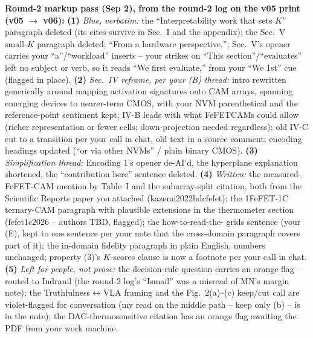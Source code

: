 \documentclass[conference]{IEEEtran}
\newcommand{\cam}{{CAM}\xspace}
\newcommand{\fefet}{{FeFET}\xspace}
\begin{document}
{\begin{pnote}[aiviolet]
\textbf{Round-2 markup pass (Sep 2), from the round-2 log on the v05
print (v05 $\to$ v06):}
{\bf (1)} \emph{Blue, verbatim:} the ``Interpretability work that
sets $K$'' paragraph deleted (its cites survive in Sec.~I and the
appendix); the Sec.~V small-$K$ paragraph deleted; ``From a hardware
perspective,''; Sec.~V's opener carries your ``a''/``workload''
inserts -- your strikes on ``This section''/``evaluates'' left no
subject or verb, so it reads ``We first evaluate,'' from your ``We
1st'' cue (flagged in place).
{\bf (2)} \emph{Sec.~IV reframe, per your (B) thread:} intro
rewritten generically around mapping activation signatures onto \cam
arrays, spanning emerging devices to nearer-term CMOS, with your NVM
parenthetical and the reference-point sentiment kept; IV-B leads
with what \fefet \cam{}s could allow (richer representation or fewer
cells; down-projection needed regardless); old IV-C cut to a
transition per your call in chat, old text in a source comment;
encoding headings updated (``or via other NVMs'' / plain binary
CMOS).
{\bf (3)} \emph{Simplification thread:} Encoding 1's opener
de-AI'd, the hyperplane explanation shortened, the ``contribution
here'' sentence deleted.
{\bf (4)} \emph{Written:} the measured-\fefet-\cam mention by
Table~I and the subarray-split citation, both from the Scientific
Reports paper you attached (kazemi2022hdcfefet); the 1FeFET-1C
ternary-\cam paragraph with plausible extensions in the thermometer
section (fefet1c2026 -- authors TBD, flagged); the how-to-read-the-
grids sentence (your (E), kept to one sentence per your note that
the cross-domain paragraph covers part of it); the in-domain
fidelity paragraph in plain English, numbers unchanged; property
(3)'s $K$-scores clause is now a footnote per your call in chat.
{\bf (5)} \emph{Left for people, not prose:} the decision-rule
question carries an orange flag -- routed to Indranil (the round-2
log's ``Ismail'' was a misread of MN's margin note); the
Truthfulness$\leftrightarrow$VLA framing and the Fig.~2(a)--(c)
keep/cut call are violet-flagged for conversation (my read on the
middle path -- keep only (b) -- is in the note); the
DAC-thermosensitive citation has an orange flag awaiting the PDF
from your work machine.


\end{pnote}}
\end{document}
